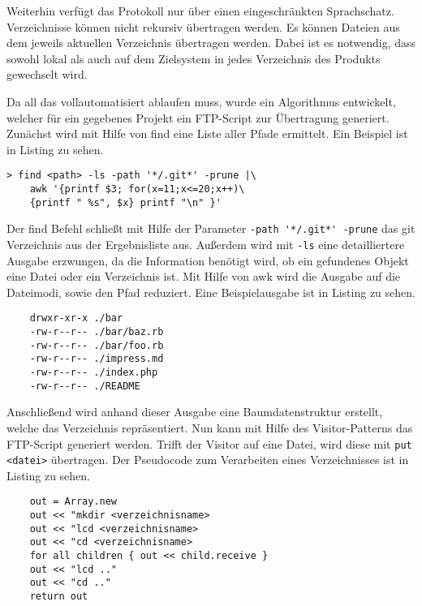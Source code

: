 Weiterhin verfügt das Protokoll nur über einen eingeschränkten Sprachschatz. Verzeichnisse können nicht rekursiv übertragen werden. Es können Dateien aus dem jeweils aktuellen Verzeichnis übertragen werden. Dabei ist es notwendig, dass sowohl lokal als auch auf dem Zielsystem in jedes Verzeichnis des Produkts gewechselt wird.

Da all das vollautomatisiert ablaufen muss, wurde ein Algorithmus entwickelt, welcher für ein gegebenes Projekt ein FTP-Script zur Übertragung generiert. Zunächst wird mit Hilfe von find eine Liste aller Pfade ermittelt. Ein Beispiel ist in Listing  zu sehen.

\begin{lstlisting}
> find <path> -ls -path '*/.git*' -prune |\
	awk '{printf $3; for(x=11;x<=20;x++)\
	{printf " %s", $x} printf "\n" }'
\end{lstlisting}

Der find Befehl schließt mit Hilfe der Parameter \lstinline!-path '*/.git*' -prune! das git Verzeichnis aus der Ergebnisliste aus. Außerdem wird mit \lstinline!-ls! eine detailliertere Ausgabe erzwungen, da die Information benötigt wird, ob ein gefundenes Objekt eine Datei oder ein Verzeichnis ist. Mit Hilfe von awk wird die Ausgabe auf die Dateimodi, sowie den Pfad reduziert. Eine Beispielausgabe ist in Listing  zu sehen.

\begin{lstlisting}
	drwxr-xr-x ./bar
	-rw-r--r-- ./bar/baz.rb
	-rw-r--r-- ./bar/foo.rb
	-rw-r--r-- ./impress.md
	-rw-r--r-- ./index.php
	-rw-r--r-- ./README
\end{lstlisting}
     
Anschließend wird anhand dieser Ausgabe eine Baumdatenstruktur erstellt, welche das Verzeichnis repräsentiert. Nun kann mit Hilfe des Visitor-Patterns das FTP-Script generiert werden. Trifft der Visitor auf eine Datei, wird diese mit \lstinline!put <datei>! übertragen. Der Pseudocode zum Verarbeiten eines Verzeichnisses ist in Listing  zu sehen.

\begin{lstlisting}
	out = Array.new
	out << "mkdir <verzeichnisname>
	out << "lcd <verzeichnisname>
	out << "cd <verzeichnisname>
	for all children { out << child.receive }
	out << "lcd .."
	out << "cd .."
	return out
\end{lstlisting}

